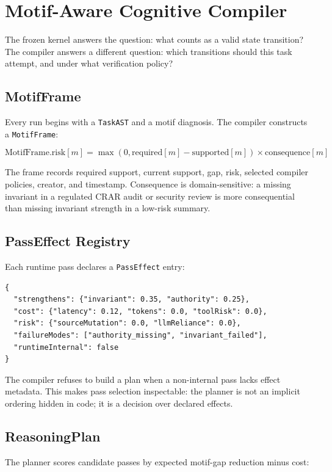 \documentclass[11pt]{article}
\begin{document}
\section{Motif-Aware Cognitive Compiler}

The frozen kernel answers the question: what counts as a valid state transition? The compiler answers a different question: which transitions should this task attempt, and under what verification policy?

\subsection{MotifFrame}

Every run begins with a \texttt{TaskAST} and a motif diagnosis. The compiler constructs a \texttt{MotifFrame}:

\[
\text{MotifFrame.risk}[m] =
\max(0, \text{required}[m] - \text{supported}[m])
\times \text{consequence}[m]
\]

The frame records required support, current support, gap, risk, selected compiler policies, creator, and timestamp. Consequence is domain-sensitive: a missing invariant in a regulated CRAR audit or security review is more consequential than missing invariant strength in a low-risk summary.

\subsection{PassEffect Registry}

Each runtime pass declares a \texttt{PassEffect} entry:

\begin{verbatim}
{
  "strengthens": {"invariant": 0.35, "authority": 0.25},
  "cost": {"latency": 0.12, "tokens": 0.0, "toolRisk": 0.0},
  "risk": {"sourceMutation": 0.0, "llmReliance": 0.0},
  "failureModes": ["authority_missing", "invariant_failed"],
  "runtimeInternal": false
}
\end{verbatim}

The compiler refuses to build a plan when a non-internal pass lacks effect metadata. This makes pass selection inspectable: the planner is not an implicit ordering hidden in code; it is a decision over declared effects.

\subsection{ReasoningPlan}

The planner scores candidate passes by expected motif-gap reduction minus cost:
\end{document}
